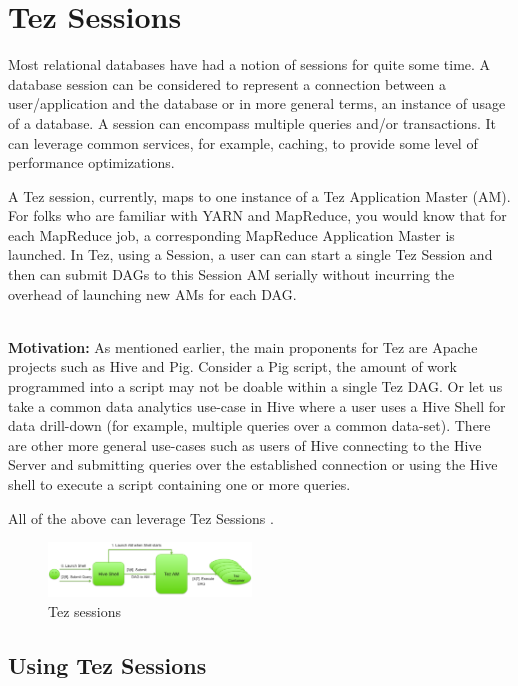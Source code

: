 \documentclass[twocolumn]{article}
\begin{document}
\section{Tez Sessions}

Most relational databases have had a notion of sessions for quite some
time. A database session can be considered to represent a connection
between a user/application and the database or in more general terms, an
instance of usage of a database. A session can encompass multiple
queries and/or transactions. It can leverage common services, for
example, caching, to provide some level of performance optimizations.

A Tez session, currently, maps to one instance of a Tez Application
Master (AM). For folks who are familiar with YARN and MapReduce, you
would know that for each MapReduce job, a corresponding MapReduce
Application Master is launched. In Tez, using a Session, a user can can
start a single Tez Session and then can submit DAGs to this Session AM
serially without incurring the overhead of launching new AMs for each
DAG.

\noindent
\\
\textbf{Motivation:} As mentioned earlier, the main proponents for Tez are Apache projects
such as Hive and Pig. Consider a Pig script, the amount of work
programmed into a script may not be doable within a single Tez DAG. Or
let us take a common data analytics use-case in Hive where a user uses a
Hive Shell for data drill-down (for example, multiple queries over a
common data-set). There are other more general use-cases such as users
of Hive connecting to the Hive Server and submitting queries over the
established connection or using the Hive shell to execute a script
containing one or more queries.

All of the above can leverage Tez Sessions \cite{Saha:2013-07}.

\begin{figure}[htb]
        \centering
        \includegraphics[width=0.48\textwidth]{sessions-tez1}
        \caption{Tez sessions}
        \label{fig17}
\end{figure}

\subsection{Using Tez Sessions}
\end{document}
